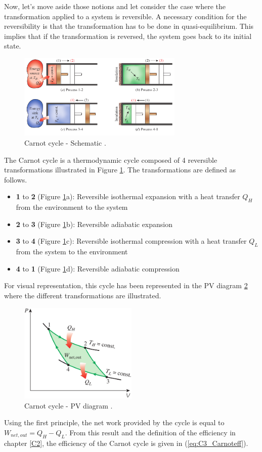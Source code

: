 Now, let’s move aside those notions and let consider the case where the transformation applied to a system is reversible. A necessary condition for the reversibility is that the transformation has to be done in quasi-equilibrium. This implies that if the transformation is reversed, the system goes back to its initial state.

\begin{figure}[h]
\centering
\includegraphics[width=0.7\textwidth]{Carnot_schema.png}
\caption{Carnot cycle - Schematic \cite{2015}.}
\label{fig:C3_Carnot}
\end{figure}

The Carnot cycle is a thermodynamic cycle composed of 4 reversible transformations illustrated in Figure \ref{fig:C3_Carnot}. The transformations are defined as follows.

\begin{itemize}
\item \textbf{1} to \textbf{2} (Figure \ref{fig:C3_Carnot}a): Reversible isothermal expansion with a heat transfer $Q_H$ from the environment to the system
\item \textbf{2} to \textbf{3} (Figure \ref{fig:C3_Carnot}b): Reversible  adiabatic expansion
\item \textbf{3} to \textbf{4} (Figure \ref{fig:C3_Carnot}c): Reversible isothermal compression with a heat transfer $Q_L$ from the system to the environment
\item \textbf{4} to \textbf{1} (Figure \ref{fig:C3_Carnot}d): Reversible adiabatic compression
\end{itemize}
For visual representation, this cycle has been represented in the PV diagram \ref{fig:C3_CarnotPV} where the different transformations are illustrated.
\begin{figure}[h]
\centering
\includegraphics[width=0.5\textwidth]{Carnot_PV.png}
\caption{Carnot cycle - PV diagram \cite{2015}.}
\label{fig:C3_CarnotPV}
\end{figure}
Using the first principle, the net work provided by the cycle is equal to $W_{net,out}=Q_H-Q_L$. From this result and the definition of the efficiency in chapter \ref{C2}, the efficiency of the Carnot cycle is given in (\ref{eq:C3_Carnoteff}).

